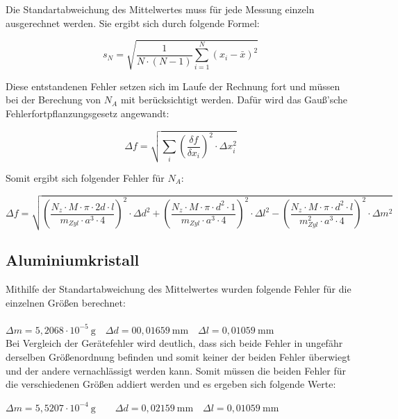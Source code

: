 \documentclass[12pt,a4paper,titlepage,headinclude,bibtotoc]{scrartcl}
\begin{document}
Die Standartabweichung des Mittelwertes muss für jede Messung einzeln ausgerechnet werden. Sie ergibt sich durch folgende Formel:

\begin{equation}
s_N=\sqrt{\frac{1}{N \cdot (N-1)}\sum_{i=1}^N (x_i -\bar{x})^2}
\end{equation}

Diese entstandenen Fehler setzen sich im Laufe der Rechnung fort und müssen bei der Berechung von $N_A$ mit berücksichtigt werden. Dafür wird das Gauß'sche Fehlerfortpflanzungsgesetz angewandt:

\begin{equation}
\Delta f =\sqrt{\sum_{i} \left( \frac{\delta f}{\delta x_i}\right)^2 \cdot\Delta x^2_i }
\end{equation}

Somit ergibt sich folgender Fehler für $N_A$:

\begin{equation}
\Delta f = \sqrt{\left(\frac{N_z \cdot M \cdot \pi \cdot 2d \cdot l}{m_{Zyl} \cdot a^3 \cdot 4}\right)^2 \cdot \Delta d^2 + \left(\frac{N_z \cdot M \cdot \pi \cdot d^2 \cdot 1}{m_{Zyl} \cdot a^3 \cdot 4}\right)^2 \cdot \Delta l^2 - \left(\frac{N_z \cdot M \cdot \pi \cdot d^2 \cdot l}{m_{Zyl}^2 \cdot a^3 \cdot 4}\right)^2 \cdot \Delta m^2}
\end{equation}

\subsection{Aluminiumkristall}
 
Mithilfe der Standartabweichung des Mittelwertes wurden folgende Fehler für die einzelnen Größen berechnet:
\\
\\
$\Delta m = 5,2068\cdot10^{-5} \ \mathrm{g} \quad \Delta d= 00,01659 \ \mathrm{mm} \quad \Delta l = 0,01059\ \mathrm{mm}$\\

\vspace{3mm}
Bei Vergleich der Gerätefehler wird deutlich, dass sich beide Fehler in ungefähr derselben Größenordnung befinden und somit keiner der beiden Fehler überwiegt und der andere vernachlässigt werden kann. Somit müssen die beiden Fehler für die verschiedenen Größen addiert werden und es ergeben sich folgende Werte:

\vspace{3mm} 
$\Delta m =5,5207\cdot 10^{-4}\ \mathrm{g} \qquad\Delta d =0,02159\ \mathrm{mm}\quad \Delta l = 0,01059\ \mathrm{mm}$
\vspace{3mm}
 
\end{document}

